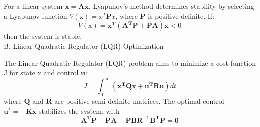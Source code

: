 \documentclass{article}
\begin{document}
\begin{multicols}{2}
		For a linear system $\mathbf{\dot{x}= Ax}$, Lyapunov’s method determines
		stability by selecting a Lyapunov function $V(\mathrm{x})=x^T\mathbf{P}x$,
		where $\mathbf{P}$ is positive definite. If:
		\begin{equation}
				\dot{V}(\mathrm{x})=\mathbf{x^T(\mathbf{A}^TP+PA)x} < 0
		\end{equation}
		then the system is stable.\\
		\vspace{0.5em}
		B. Linear Quadratic Regulator (LQR) Optimization
		
		The Linear Quadratic Regulator (LQR) problem aims to
		minimize a cost function J for state x and control $\mathbf{u}$:
		\begin{equation}
			J=\int_{0}^{\infty}(\mathbf{x^TQx+u^TRu})dt
		\end{equation}
		where $\mathbf{Q}$ and $\mathbf{R}$ are positive semi-definite matrices. The
		optimal control $\mathbf{u^*= - Kx}$ stabilizes the system, with 
		\begin{equation}
			\mathbf{A^TP+PA-PBR^{-1}B^TP=0}
		\end{equation}
	\end{multicols}
	
\end{document}
